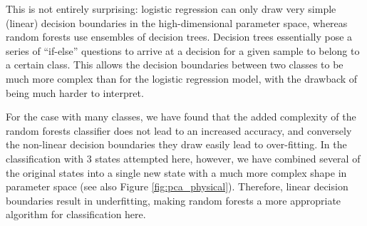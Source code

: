\documentclass[fleqn,usenatbib]{mnras}
\begin{document}
This is not entirely surprising: logistic regression can only draw very simple (linear) decision boundaries in the high-dimensional parameter space, whereas random forests use ensembles of decision trees. Decision trees essentially pose a series of ``if-else'' questions to arrive at a decision for a given sample to belong to a certain class. This allows the decision boundaries between two classes to be much more complex than for the logistic regression model, with the drawback of being much harder to interpret.

 For the case with many classes, we have found that the added complexity of the random forests classifier does not lead to an increased accuracy, and conversely the non-linear decision boundaries they draw easily lead to over-fitting. In the classification with $3$ states attempted here, however, we have combined several of the original states into a single new state with a much more complex shape in parameter space (see also Figure \ref{fig:pca_physical}). Therefore, linear decision boundaries result in underfitting, making random forests a more appropriate algorithm for classification here. 
\end{document}
